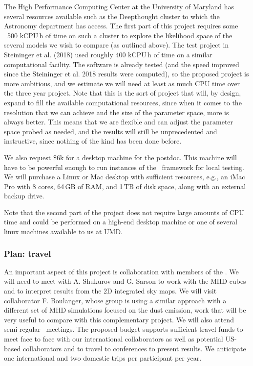 The High Performance Computing Center at the University of Maryland has several resources available such as the Deepthought cluster to which the Astronomy department has access.  The first part of this project requires some ~500 kCPU\,h of time on such a cluster to explore the likelihood space of the several models we wish to compare (as outlined above).  The test project in Steininger et al. (2018) used roughly 400 kCPU\,h of time on a similar computational facility. The software is already tested (and the speed improved since the Steininger et al. 2018 results were computed), so the proposed project is more ambitious, and we estimate we will need at least as much CPU time over the three year project. Note that this is the sort of project that will, by design, expand to fill the available computational resources, since when it comes to the resolution that we can achieve and the size of the parameter space, more is always better. This means that we are flexible and can adjust the parameter space probed as needed, and the results will still be unprecedented and instructive, since nothing of the kind has been done before.

We also request \$6k for a desktop machine for the postdoc. This machine will have to be powerful enough to run instances of the \imagineSW\ framework for local testing.  We will purchase a Linux or Mac desktop with sufficient resources, e.g., an iMac Pro with 8 cores, 64\,GB of RAM, and 1\,TB of disk space, along with an external backup drive.

Note that the second part of the project does not require large amounts of CPU time and could be performed on a high-end desktop machine or one of several linux machines available to us at UMD.  



\subsubsection*{Plan:  travel}

An important aspect of this project is collaboration with members of the \imagineC.  We will need to meet with A. Shukurov and G. Sarson to work with the MHD cubes and to interpret results from the 2D integrated sky maps. We will visit collaborator F. Boulanger, whose group is using a similar approach with a different set of MHD simulations focused on the dust emission, work that will be very useful to compare with this complementary project.  We will also attend semi-regular \imagineC\ meetings.  The proposed budget supports sufficient travel funds to meet face to face with our international collaborators as well as potential US-based collaborators and to travel to conferences to present results.  We anticipate one international and two domestic trips per participant per year.


